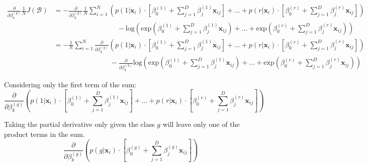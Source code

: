 \documentclass{article}
\begin{document}
\begin{equation*}
    \begin{split}
        \frac{\partial}{\partial \beta_{k}^{(g)}} \frac{1}{N} J(\mathcal{B}) & = - \frac{\partial}{\partial \beta_{k}^{(g)}} \frac{1}{N} \sum_{i = 1}^{N} \left ( p(1 | \boldsymbol x_{i}) \cdot \left [ \beta_{0}^{(1)} + \sum_{j = 1}^{D} \beta_{j}^{(1)} \boldsymbol x_{ij} \right ] + \ldots + p(r | \boldsymbol x_{i}) \cdot \left [ \beta_{0}^{(r)} + \sum_{j = 1}^{D} \beta_{j}^{(r)} \boldsymbol x_{ij} \right ] \right ) \\
        & \quad \quad \quad \quad \quad \quad \quad \quad \quad - \text{log}{\left ( \text{exp}\left ( \beta_{0}^{(1)} + \sum_{j = 1}^{D} \beta_{j}^{(1)} \boldsymbol x_{ij} \right ) + \ldots + \text{exp}\left ( \beta_{0}^{(r)} + \sum_{j = 1}^{D} \beta_{j}^{(r)} \boldsymbol x_{ij} \right ) \right )} \\
        & = - \frac{1}{N} \sum_{i = 1}^{N} \frac{\partial}{\partial \beta_{k}^{(g)}} \left ( p(1 | \boldsymbol x_{i}) \cdot \left [ \beta_{0}^{(1)} + \sum_{j = 1}^{D} \beta_{j}^{(1)} \boldsymbol x_{ij} \right ] + \ldots + p(r | \boldsymbol x_{i}) \cdot \left [ \beta_{0}^{(r)} + \sum_{j = 1}^{D} \beta_{j}^{(r)} \boldsymbol x_{ij} \right ] \right ) \\ 
        & \quad \quad \quad \quad \quad \quad \quad \quad - \frac{\partial}{\partial \beta_{k}^{(g)}} \text{log}{\left ( \text{exp}\left ( \beta_{0}^{(1)} + \sum_{j = 1}^{D} \beta_{j}^{(1)} \boldsymbol x_{ij} \right ) + \ldots + \text{exp}\left ( \beta_{0}^{(r)} + \sum_{j = 1}^{D} \beta_{j}^{(r)} \boldsymbol x_{ij} \right ) \right )}
    \end{split}
\end{equation*}

Considering only the first term of the sum:
\begin{equation*}
    \frac{\partial}{\partial \beta_{k}^{(g)}} \left ( p(1 | \boldsymbol x_{i}) \cdot \left [ \beta_{0}^{(1)} + \sum_{j = 1}^{D} \beta_{j}^{(1)} \boldsymbol x_{ij} \right ] + \ldots + p(r | \boldsymbol x_{i}) \cdot \left [ \beta_{0}^{(r)} + \sum_{j = 1}^{D} \beta_{j}^{(r)} \boldsymbol x_{ij} \right ] \right )
\end{equation*}

Taking the partial derivative only given the class $g$ will leave only one of the product terms in the sum.
\begin{equation*}
    \frac{\partial}{\partial \beta_{k}^{(g)}} \left ( p(g | \boldsymbol x_{i}) \cdot \left [ \beta_{0}^{(g)} + \sum_{j = 1}^{D} \beta_{j}^{(g)} \boldsymbol x_{ij} \right ] \right )
\end{equation*}
\end{document}
